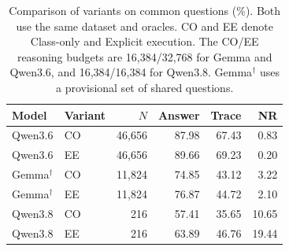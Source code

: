\begin{table}[t]
\centering
\caption{Comparison of \benchmark variants on common questions (\%). Both use the same dataset and oracles. CO and EE denote Class-only and Explicit execution. The CO/EE reasoning budgets are 16,384/32,768 for Gemma and Qwen3.6, and 16,384/16,384 for Qwen3.8. Gemma$^\dagger$ uses a provisional set of shared questions.}
\label{tab:prompt-comparison}
\scriptsize
\setlength{\tabcolsep}{3pt}
\begin{tabular}{llrrrr}
\toprule
Model & Variant & $N$ & Answer & Trace & NR \\
\midrule
Qwen3.6 & CO & 46,656 & 87.98 & 67.43 & 0.83 \\
Qwen3.6 & EE & 46,656 & 89.66 & 69.23 & 0.20 \\
\midrule
Gemma$^\dagger$ & CO & 11,824 & 74.85 & 43.12 & 3.22 \\
Gemma$^\dagger$ & EE & 11,824 & 76.87 & 44.72 & 2.10 \\
\midrule
Qwen3.8 & CO & 216 & 57.41 & 35.65 & 10.65 \\
Qwen3.8 & EE & 216 & 63.89 & 46.76 & 19.44 \\
\bottomrule
\end{tabular}
\end{table}
